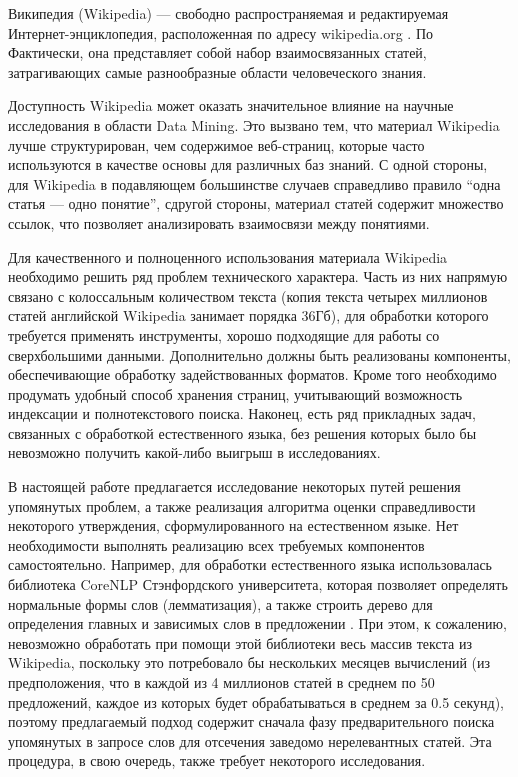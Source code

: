 Википедия (Wikipedia) --- свободно распространяемая и редактируемая 
Интернет-энциклопедия, расположенная по адресу wikipedia.org \cite{wikipedia}. По 
Фактически, она представляет собой набор взаимосвязанных статей, затрагивающих самые 
разнообразные области человеческого знания. 

Доступность Wikipedia может оказать значительное влияние на научные
исследования в области Data Mining.
Это вызвано тем, что материал Wikipedia лучше структурирован, чем содержимое веб-страниц, которые
часто используются в качестве основы для различных баз знаний. С одной
стороны, для Wikipedia в подавляющем большинстве случаев справедливо
правило ``одна статья --- одно понятие'', сдругой стороны, материал
статей содержит множество ссылок, что позволяет анализировать
взаимосвязи между понятиями. 

Для качественного и полноценного использования материала Wikipedia
необходимо решить ряд проблем технического характера. Часть из них
напрямую связано с колоссальным количеством текста (копия текста четырех 
миллионов статей английской Wikipedia занимает порядка 36Гб), 
для обработки которого требуется применять инструменты, хорошо
подходящие для работы со сверхбольшими данными. Дополнительно должны быть
реализованы компоненты, обеспечивающие обработку задействованных форматов. Кроме того 
необходимо продумать удобный способ хранения страниц, учитывающий 
возможность индексации и полнотекстового поиска. Наконец, есть ряд 
прикладных задач, связанных с обработкой естественного языка, без решения 
которых было бы невозможно получить какой-либо выигрыш в исследованиях.

В настоящей работе предлагается исследование некоторых путей решения
 упомянутых проблем, а также реализация алгоритма оценки
 справедливости некоторого утверждения, сформулированного на
 естественном языке.  Нет необходимости выполнять реализацию всех
 требуемых компонентов самостоятельно. Например, для обработки
 естественного языка использовалась библиотека CoreNLP Стэнфордского
 университета, которая позволяет определять нормальные формы слов
 (лемматизация), а также строить дерево для определения главных и
 зависимых слов в предложении \cite{corenlp}. При этом, к сожалению, невозможно
 обработать при помощи этой библиотеки весь массив текста из
 Wikipedia, поскольку это потребовало бы нескольких месяцев вычислений
 (из предположения, что в каждой из 4 миллионов статей в среднем по 50 предложений,
 каждое из которых будет обрабатываться в среднем за 0.5 секунд), 
поэтому предлагаемый подход содержит
 сначала фазу предварительного поиска упомянутых в запросе слов для
 отсечения заведомо нерелевантных статей. Эта процедура, в свою
 очередь, также требует некоторого исследования.

